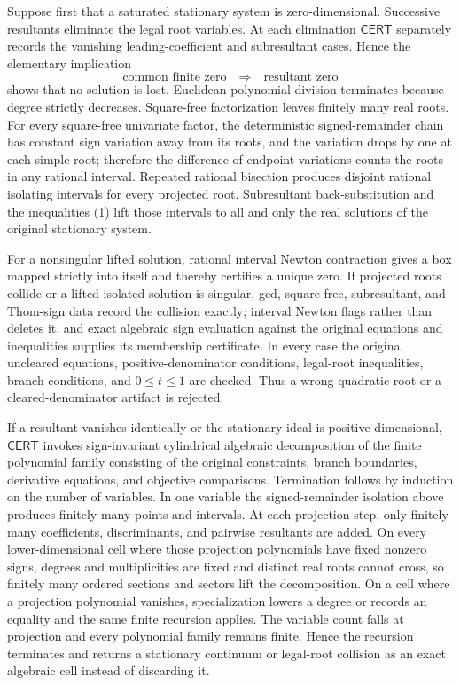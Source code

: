 Suppose first that a saturated stationary system is zero-dimensional.  Successive resultants eliminate the legal root variables.  At each elimination \(\mathsf{CERT}\) separately records the vanishing leading-coefficient and subresultant cases.  Hence the elementary implication
\[
 \text{common finite zero}\quad\Longrightarrow\quad\text{resultant zero} \tag{10}
\]
shows that no solution is lost.  Euclidean polynomial division terminates because degree strictly decreases.  Square-free factorization leaves finitely many real roots.  For every square-free univariate factor, the deterministic signed-remainder chain has constant sign variation away from its roots, and the variation drops by one at each simple root; therefore the difference of endpoint variations counts the roots in any rational interval.  Repeated rational bisection produces disjoint rational isolating intervals for every projected root.  Subresultant back-substitution and the inequalities (1) lift those intervals to all and only the real solutions of the original stationary system.

For a nonsingular lifted solution, rational interval Newton contraction gives a box mapped strictly into itself and thereby certifies a unique zero.  If projected roots collide or a lifted isolated solution is singular, gcd, square-free, subresultant, and Thom-sign data record the collision exactly; interval Newton flags rather than deletes it, and exact algebraic sign evaluation against the original equations and inequalities supplies its membership certificate.  In every case the original uncleared equations, positive-denominator conditions, legal-root inequalities, branch conditions, and \(0\leq t\leq1\) are checked.  Thus a wrong quadratic root or a cleared-denominator artifact is rejected.

If a resultant vanishes identically or the stationary ideal is positive-dimensional, \(\mathsf{CERT}\) invokes sign-invariant cylindrical algebraic decomposition of the finite polynomial family consisting of the original constraints, branch boundaries, derivative equations, and objective comparisons.  Termination follows by induction on the number of variables.  In one variable the signed-remainder isolation above produces finitely many points and intervals.  At each projection step, only finitely many coefficients, discriminants, and pairwise resultants are added.  On every lower-dimensional cell where those projection polynomials have fixed nonzero signs, degrees and multiplicities are fixed and distinct real roots cannot cross, so finitely many ordered sections and sectors lift the decomposition.  On a cell where a projection polynomial vanishes, specialization lowers a degree or records an equality and the same finite recursion applies.  The variable count falls at projection and every polynomial family remains finite.  Hence the recursion terminates and returns a stationary continuum or legal-root collision as an exact algebraic cell instead of discarding it.

